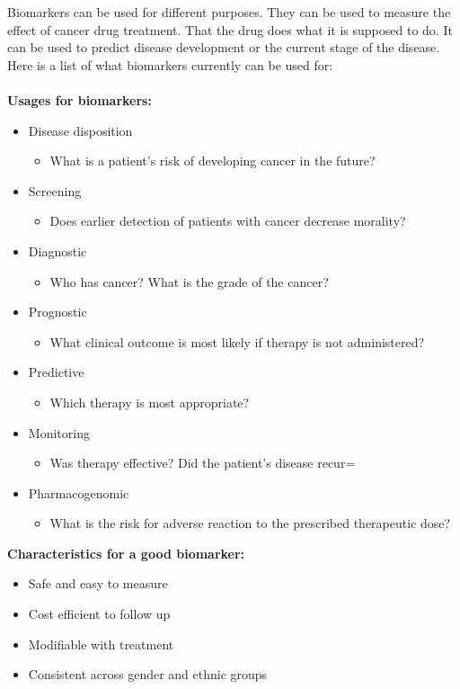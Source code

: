 \documentclass[UKenglish,11pt,a4paper]{article}
\begin{document}
Biomarkers can be used for different purposes. They can be used to measure the effect of cancer drug treatment. That the
drug does what it is supposed to do. It can be used to predict disease development or the current stage of the
disease. Here is a list of what biomarkers currently can be used for:
\\\\
\textbf{Usages for biomarkers:} \cite{beyondpsa}
\begin{itemize}
    \item Disease disposition
        \begin{itemize}
            \item What is a patient's risk of developing cancer in the future?
        \end{itemize}
    \item Screening
        \begin{itemize}
            \item Does earlier detection of patients with cancer decrease morality?
        \end{itemize}
    \item Diagnostic
        \begin{itemize}
            \item Who has cancer? What is the grade of the cancer?
        \end{itemize}
    \item Prognostic
        \begin{itemize}
            \item What clinical outcome is most likely if therapy is not administered?
        \end{itemize}
    \item Predictive
        \begin{itemize}
            \item Which therapy is most appropriate?
        \end{itemize}
    \item Monitoring
        \begin{itemize}
            \item Was therapy effective? Did the patient's disease recur=
        \end{itemize}
    \item Pharmacogenomic
        \begin{itemize}
            \item What is the risk for adverse reaction to the prescribed therapeutic dose?
        \end{itemize}
\end{itemize}
\textbf{Characteristics for a good biomarker:}
\begin{itemize}
    \item Safe and easy to measure
    \item Cost efficient to follow up
    \item Modifiable with treatment
    \item Consistent across gender and ethnic groups
\end{itemize}
\end{document}
